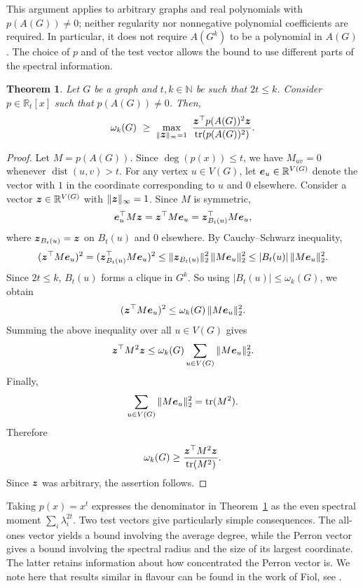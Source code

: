 \documentclass[10pt,a4paper]{article}
\theoremstyle{plain}
\newtheorem{theorem}{Theorem}[section]
\numberwithin{equation}{section}
\DeclareMathOperator{\tr}{tr}
\DeclareMathOperator{\dist}{dist}
\def\e{\mbox{\boldmath $e$}}
\def\z{\mbox{\boldmath $z$}}
\begin{document}
This argument applies to arbitrary graphs and real polynomials with $p(A(G))\ne 0$; neither regularity nor nonnegative polynomial coefficients are required. In particular, it does not require $A(G^k)$ to be a polynomial in $A(G)$. The choice of $p$ and of the test vector allows the bound to use different parts of the spectral information.

\begin{theorem}\label{thm:general_lower_bound}
Let $G$ be a graph and $t, k \in \mathbb{N}$ be such that $2t \leq k$. Consider $p\in \mathbb{R}_t[x]$ such that $p(A(G))\ne 0$. Then, 
\[\omega_k(G)\ \ge\ \max_{\|\z\|_\infty = 1} \ \frac{\z^\top p(A(G))^2\z}{\tr(p(A(G))^2)}.
\]
\end{theorem}

\begin{proof} Let $M = p(A(G))$. Since $\deg(p(x))\le t$, we have $M_{uv}=0$ whenever $\dist(u,v)>t$. For any vertex $u\in V(G)$, let $\e_u\in \mathbb{R}^{V(G)}$ denote the vector with $1$ in the coordinate corresponding to $u$ and $0$ elsewhere. Consider a vector $\z\in \mathbb{R}^{V(G)}$ with $\|\z\|_\infty = 1$. Since $M$ is symmetric,
\[
        \e_u^\top M\z = \z^\top M\e_u = \z_{B_t(u)}^\top M\e_u,
\]
where $\z_{B_t(u)} = \z$ on $B_t(u)$ and $0$ elsewhere. By Cauchy--Schwarz inequality, 
\[
        (\z^\top M\e_u)^2 = (\z_{B_t(u)}^\top M\e_u)^2
        \le \|\z_{B_t(u)}\|_2^2\,\|M\e_u\|_2^2
        \le |B_t(u)|\,\|M\e_u\|_2^2 .
\]
Since $2t\le k$, $B_t(u)$ forms a clique in $G^k$. So using $|B_t(u)|\le \omega_k(G)$, we obtain
\[
        (\z^\top M\e_u)^2
        \le
        \omega_k(G)\,\|M\e_u\|_2^2 .
\]
Summing the above inequality over all $u\in V(G)$ gives
\[
        \z^\top M^2\z
        \le
        \omega_k(G)\sum_{u\in V(G)} \|M\e_u\|_2^2 .
\]
Finally,
\[
        \sum_{u\in V(G)} \|M\e_u\|_2^2
        =
        \tr(M^2).
\]
Therefore
\[
        \omega_k(G)
        \ge
        \frac{\z^\top M^2\z}
             {\tr(M^2)}.
\]
Since $\z$ was arbitrary, the assertion follows. 
\end{proof}

Taking $p(x)=x^t$ expresses the denominator in Theorem~\ref{thm:general_lower_bound} as the even spectral moment $\sum_i\lambda_i^{2t}$. Two test vectors give particularly simple consequences. The all-ones vector yields a bound involving the average degree, while the Perron vector gives a bound involving the spectral radius and the size of its largest coordinate. The latter retains information about how concentrated the Perron vector is. We note here that results similar in flavour can be found in the work of Fiol, see \cite{Fiol_2002, Fiol_2013}.
\end{document}
